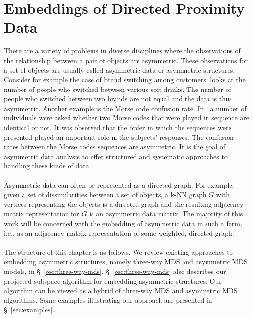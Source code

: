 \chapter{Embeddings of Directed Proximity Data}
\label{cha:embedd-direct-prox}
There are a variety of problems in diverse disciplines where the
observations of the relationship between a pair of objects are
asymmetric. These observations for a set of objects are usually called
asymmetric data or asymmetric structures. Consider for example the
case of brand switching among customers. \citet{desarbo84} looks at
the number of people who switched between various soft drinks. The
number of people who switched between two brands are not equal and the
data is thus asymmetric. Another example is the Morse code confusion
rate. In \citet{rothkopf57}, a number of individuals were asked
whether two Morse codes that were played in sequence are identical or
not. It was observed that the order in which the sequences were
presented played an important role in the subjects' responses. The
confusion rates between the Morse codes sequences are asymmetric.  It
is the goal of asymmetric data analysis to
offer structured and systematic approaches to handling these kinds of data. \\
\\
%
\noindent Asymmetric data can often be represented as a directed
graph. For example, given a set of dissimilarities between a set of
objects, a k-NN graph $G$ with vertices representing the objects is a
directed graph and the resulting adjacency matrix representation for
$G$ is an asymmetric data matrix. The majority of this work will be
concerned with the embedding of asymmetric data in such a form, i.e.,
as an adjacency matrix representation of some weighted, directed
graph. \\ \\
%
\noindent The structure of this chapter is as follows. We review
existing approaches to embedding asymmetric structures, namely
three-way MDS and asymmetric MDS models, in
\S~\ref{sec:three-way-mds}. \S~\ref{sec:three-way-mds} also describes
our projected subspace algorithm for embedding asymmetric
structures. Our algorithm can be viewed as a hybrid of three-way MDS
and asymmetric MDS algorithms. Some examples illustrating our approach
are presented in \S~\ref{sec:examples}.
%
